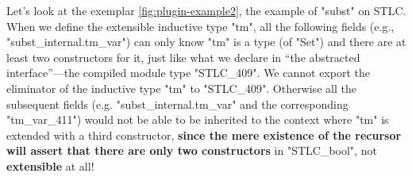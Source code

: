 








Let's look at the exemplar \cref{fig:plugin-example2}, the example of
"subst" on STLC. When we define the extensible inductive type "tm", all
the following fields (e.g., "subst_internal.tm_var") can only know "tm"
is a type (of "Set") and there are at least two constructors for it,
just like what we declare in ``the abstracted interface''---the compiled
module type "STLC_409". We cannot export
the eliminator of the inductive type "tm" to "STLC_409".
Otherwise all the subsequent fields (e.g. "subst_internal.tm_var" and
the corresponding "tm_var_411") would not be able to be inherited to the
context where "tm" is extended with a third constructor, \textbf{since
the mere existence of the recursor will assert that there are only two
constructors} in "STLC_bool", not \textbf{extensible} at all!

